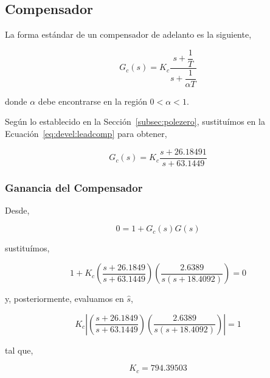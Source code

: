 \documentclass[12pt,a4paper]{article}
\begin{document}
    \subsection{Compensador}
    
      La forma estándar de un compensador de adelanto es la siguiente, 

      \begin{equation}  
        G_{c}\left(s\right) = K_{c}\dfrac{s+\dfrac{1}{T}}{s + \dfrac{1}{\alpha T}}
        \label{eq:devel:leadcomp}
      \end{equation}

      donde \( \alpha \) debe encontrarse en la región \( 0 < \alpha < 1 \). 

      Según lo establecido en la Sección~\ref{subsec:polezero}, sustituímos en la 
      Ecuación~\ref{eq:devel:leadcomp} para obtener, 

      \begin{equation} 
        G_{c}\left(s\right) = K_{c}\dfrac{s + 26.18491}{s + 63.1449}
      \end{equation}
          
        \subsubsection{Ganancia del Compensador}

          Desde, 

          \begin{equation}
            0 = 1 + G_{c}\left(s\right)G\left(s\right)
            \label{eq:devel:compdsys_formula}
          \end{equation}

          sustituímos, 

          \begin{equation} 
            1 + K_{c}\left(\dfrac{s + 26.1849}{s + 63.1449}\right)\left(\dfrac{2.6389}{s\left(s + 18.4092\right)}\right) = 0 
          \end{equation}

          y, posteriormente, evaluamos en \( \hat{s} \), 

          \begin{equation} 
            K_{c}\left|\left(\dfrac{s + 26.1849}{s + 63.1449}\right)\left(\dfrac{2.6389}{s\left(s + 18.4092\right)}\right)\right| = 1 
          \end{equation}

          tal que, 

          \begin{equation}
            K_{c} = 794.39503 
          \end{equation}
\end{document}
